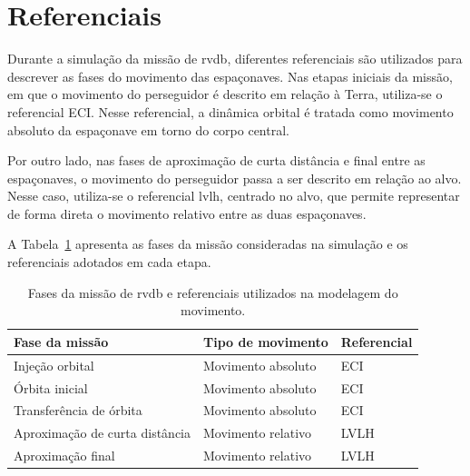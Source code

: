 \section{Referenciais}

Durante a simulação da missão de \gls{rvdb}, diferentes referenciais são utilizados para descrever as fases do movimento das espaçonaves. 
Nas etapas iniciais da missão, em que o movimento do perseguidor é descrito em relação à Terra, utiliza-se o referencial ECI. 
Nesse referencial, a dinâmica orbital é tratada como movimento absoluto da espaçonave em torno do corpo central.

Por outro lado, nas fases de aproximação de curta distância e final entre as espaçonaves, o movimento do perseguidor passa a ser descrito em relação ao alvo. 
Nesse caso, utiliza-se o referencial \gls{lvlh}, centrado no alvo, que permite representar de forma direta o movimento relativo entre as duas espaçonaves.

A Tabela~\ref{tab_fases_missao_referenciais} apresenta as fases da missão consideradas na simulação e os referenciais adotados em cada etapa.

\begin{table}[H]
\centering
\caption{Fases da missão de \gls{rvdb} e referenciais utilizados na modelagem do movimento.}
\label{tab_fases_missao_referenciais}
\begin{tabular}{lll}
\hline
\textbf{Fase da missão} & \textbf{Tipo de movimento} & \textbf{Referencial} \\
\hline
Injeção orbital                & Movimento absoluto & ECI \\
Órbita inicial                 & Movimento absoluto & ECI \\
Transferência de órbita        & Movimento absoluto & ECI \\
Aproximação de curta distância & Movimento relativo & LVLH \\
Aproximação final              & Movimento relativo & LVLH \\
\hline
\end{tabular}
\end{table}